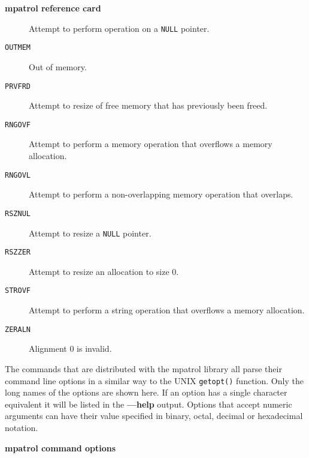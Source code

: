 \documentclass[a4paper,landscape,final]{article}
\newcommand{\heading}[1]{\textbf{\normalsize #1}}
\newcommand{\function}[1]{\texttt{#1()}}
\newcommand{\error}[1]{\texttt{#1}}
\newcommand{\flag}[1]{\textbf{---#1}}
\begin{document}
\begin{multicols}{3}{\textbf{\Large mpatrol reference card}}
\begin{description}
\hfill Attempt to perform operation on a \texttt{NULL} pointer.
\item[\error{OUTMEM}]
\hfill Out of memory.
\item[\error{PRVFRD}]
Attempt to resize of free memory that has previously been freed.
\item[\error{RNGOVF}]
Attempt to perform a memory operation that overflows a memory allocation.
\item[\error{RNGOVL}]
Attempt to perform a non-overlapping memory operation that overlaps.
\item[\error{RSZNUL}]
\hfill Attempt to resize a \texttt{NULL} pointer.
\item[\error{RSZZER}]
\hfill Attempt to resize an allocation to size 0.
\item[\error{STROVF}]
Attempt to perform a string operation that overflows a memory allocation.
\item[\error{ZERALN}]
\hfill Alignment 0 is invalid.
\end{description}

\vskip 12pt

The commands that are distributed with the mpatrol library all parse their
command line options in a similar way to the UNIX \function{getopt} function.
Only the long names of the options are shown here.  If an option has a single
character equivalent it will be listed in the \flag{help} output.  Options that
accept numeric arguments can have their value specified in binary, octal,
decimal or hexadecimal notation.

\vskip 12pt
\heading{mpatrol command options}
\vskip 6pt


\end{multicols}
\end{document}
